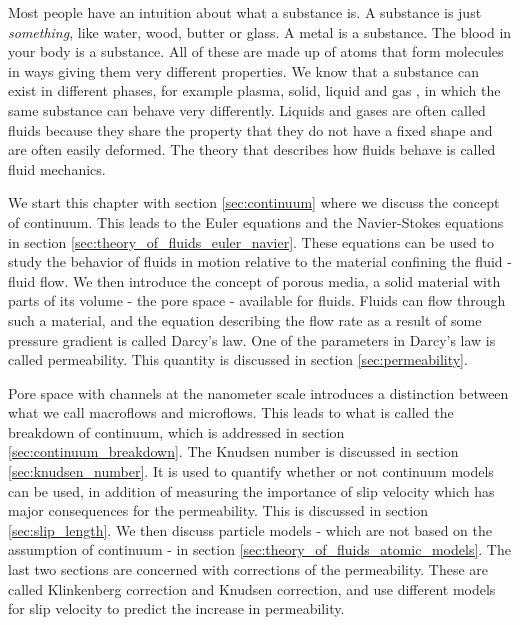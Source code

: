 Most people have an intuition about what a substance is. A substance is just \textit{something}, like water, wood, butter or glass. A metal is a substance. The blood in your body is a substance. All of these are made up of atoms that form molecules in ways giving them very different properties. We know that a substance can exist in different phases, for example plasma, solid, liquid and gas \cite{ravndal2008statmech}, in which the same substance can behave very differently. Liquids and gases are often called fluids because they share the property that they do not have a fixed shape and are often easily deformed. The theory that describes how fluids behave is called fluid mechanics.

We start this chapter with section \ref{sec:continuum} where we discuss the concept of continuum. This leads to the Euler equations and the Navier-Stokes equations in section \ref{sec:theory_of_fluids_euler_navier}. These equations can be used to study the behavior of fluids in motion relative to the material confining the fluid - fluid flow. We then introduce the concept of porous media, a solid material with parts of its volume - the pore space - available for fluids. Fluids can flow through such a material, and the equation describing the flow rate as a result of some pressure gradient is called Darcy's law. One of the parameters in Darcy's law is called permeability. This quantity is discussed in section \ref{sec:permeability}.

Pore space with channels at the nanometer scale introduces a distinction between what we call macroflows and microflows. This leads to what is called the breakdown of continuum, which is addressed in section \ref{sec:continuum_breakdown}. The Knudsen number is discussed in section \ref{sec:knudsen_number}. It is used to quantify whether or not continuum models can be used, in addition of measuring the importance of slip velocity which has major consequences for the permeability. This is discussed in section \ref{sec:slip_length}. We then discuss particle models - which are not based on the assumption of continuum - in section \ref{sec:theory_of_fluids_atomic_models}. The last two sections are concerned with corrections of the permeability. These are called Klinkenberg correction and Knudsen correction, and use different models for slip velocity to predict the increase in permeability.

